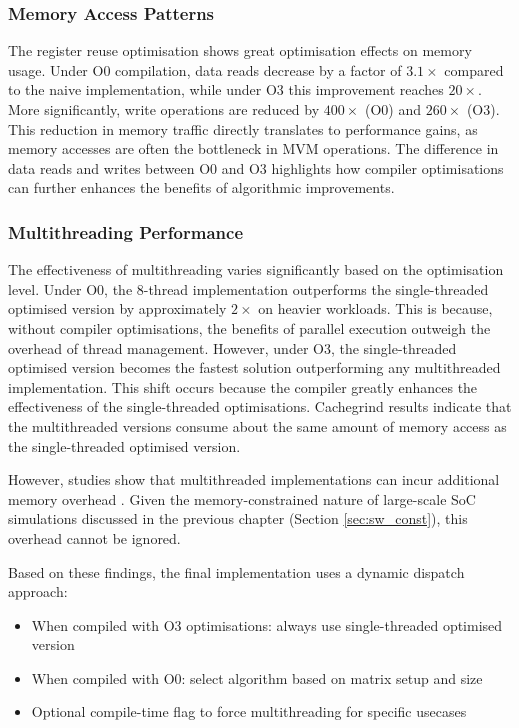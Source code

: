 \subsubsection{Memory Access Patterns}\label{sec:mem_access}
The register reuse optimisation shows great optimisation effects on memory usage. 
Under O0 compilation, data reads decrease by a factor of $3.1\times$ compared to the naive implementation, while under O3 this improvement reaches $20\times$. 
More significantly, write operations are reduced by $400\times$ (O0) and $260\times$ (O3).
This reduction in memory traffic directly translates to performance gains, as memory accesses are often the bottleneck in MVM operations.
The difference in data reads and writes between O0 and O3 highlights how compiler optimisations can further enhances the benefits of algorithmic improvements.

\subsubsection{Multithreading Performance}\label{sec:multi_perf}

The effectiveness of multithreading varies significantly based on the optimisation level.
Under O0, the 8-thread implementation outperforms the single-threaded optimised version by approximately $2\times$ on heavier workloads.
This is because, without compiler optimisations, the benefits of parallel execution outweigh the overhead of thread management.
However, under O3, the single-threaded optimised version becomes the fastest solution outperforming any multithreaded implementation.
This shift occurs because the compiler greatly enhances the effectiveness of the single-threaded optimisations.
Cachegrind results indicate that the multithreaded versions consume about the same amount of memory access as the single-threaded optimised version.

However, studies show that multithreaded implementations can incur additional memory overhead \cite{tang_multithreaded_2024}. 
Given the memory-constrained nature of large-scale SoC simulations discussed in the previous chapter (Section 
\ref{sec:sw_const}), this overhead cannot be ignored.

Based on these findings, the final implementation uses a dynamic dispatch approach:
\begin{itemize}
    \item When compiled with O3 optimisations: always use single-threaded optimised version
    \item When compiled with O0: select algorithm based on matrix setup and size
    \item Optional compile-time flag to force multithreading for specific usecases
\end{itemize}

